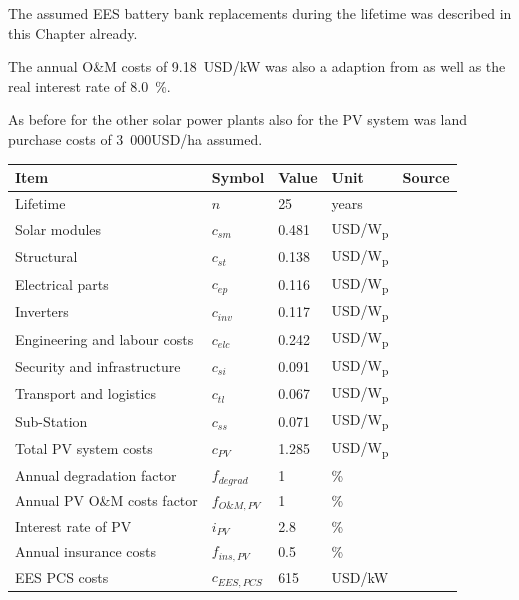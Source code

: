 The assumed EES battery bank replacements during the lifetime was described in this Chapter already.

The annual O\&M costs of \SI{9.18}{USD/kW} was also a adaption from \cite{Zakeri2015} as well as the real interest rate of 8.0~\%.

As before for the other solar power plants also for the PV system was land purchase costs of 3~000USD/ha \cite{Cassell2012} assumed.
\pagebreak
\begin{table}[!h]  
  \centering
	\begin{tabular}{  p{5.4cm} C{1.5cm} C{1.5cm}  C{1.7cm}  C{4.0cm} } 
	\hline	
\textbf{Item} & \textbf{Symbol}& \textbf{Value} & \textbf{Unit} & \textbf{Source}\\ \hline \hline
Lifetime &$n$ & 25 & years & \cite{FraunhoferISE2013} \\ \hline
Solar modules & $c_{sm}$&0.481 & USD/W\textsubscript{p} & \cite{Terblanche2015}\\ 
Structural &$c_{st}$ &0.138 & USD/W\textsubscript{p} & \cite{Terblanche2015} \\ 
Electrical parts &$c_{ep}$ &0.116 & USD/W\textsubscript{p} & \cite{Terblanche2015} \\ 
Inverters&$c_{inv}$ &0.117 & USD/W\textsubscript{p} & \cite{Terblanche2015} \\ 
Engineering and labour costs & $c_{elc}$ & 0.242 & USD/W\textsubscript{p} & \cite{Terblanche2015} \\ 
Security and infrastructure & $c_{si}$& 0.091 & USD/W\textsubscript{p} & \cite{Terblanche2015} \\ 
Transport and logistics & $c_{tl}$& 0.067 & USD/W\textsubscript{p} & \cite{Terblanche2015}\\ 
Sub-Station & $c_{ss}$ & 0.071 & USD/W\textsubscript{p} &\cite{Terblanche2015} \\ \hline
Total PV system costs & $c_{PV}$ & 1.285 &  USD/W\textsubscript{p} &\cite{Terblanche2015} \\ 
Annual degradation factor &$f_{degrad}$ & 1 & \% & \cite{Tidball2010}\\ 
Annual PV O\&M costs factor &$f_{O\&M,PV}$ & 1 & \% & \cite{IEA2014a}\\
Interest rate of PV & $i_{PV}$& 2.8 & \% & \cite{FraunhoferISE2013} \\ 
Annual insurance costs & $f_{ins,PV}$ & 0.5 & \% & \cite{InternationalFinanceCorporation2015}\\ \hline
EES PCS costs & $c_{EES,PCS}$ & 615 & USD/kW & \cite{Zakeri2015} \\ 

\end{tabular}
\end{table}

